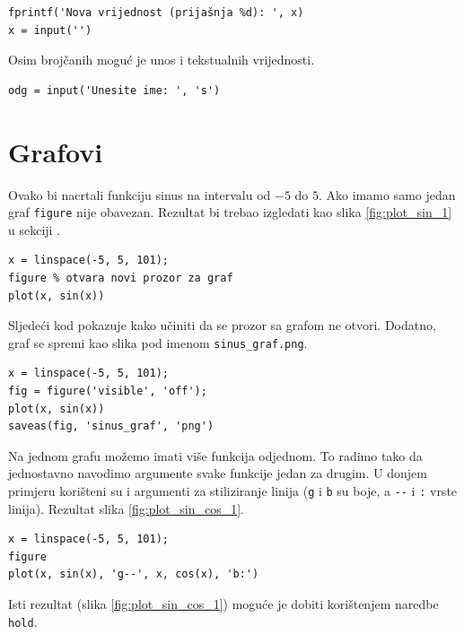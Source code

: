 \documentclass[a4paper, 10pt]{article}
\begin{document}
\begin{lstlisting}
fprintf('Nova vrijednost (prijašnja %d): ', x)
x = input('')
\end{lstlisting}

Osim brojčanih moguć je unos i tekstualnih vrijednosti.

\begin{lstlisting}
odg = input('Unesite ime: ', 's')
\end{lstlisting}


\section{Grafovi}

Ovako bi nacrtali funkciju sinus na intervalu od $-5$ do $5$.
Ako imamo samo jedan graf \texttt{figure} nije obavezan.
Rezultat bi trebao izgledati kao slika \ref{fig:plot_sin_1} u sekciji .

\begin{lstlisting}
x = linspace(-5, 5, 101);
figure % otvara novi prozor za graf
plot(x, sin(x))
\end{lstlisting}

Sljedeći kod pokazuje kako učiniti da se prozor sa grafom ne otvori.
Dodatno, graf se spremi kao slika pod imenom \texttt{sinus\_graf.png}.

\begin{lstlisting}
x = linspace(-5, 5, 101);
fig = figure('visible', 'off');
plot(x, sin(x))
saveas(fig, 'sinus_graf', 'png')
\end{lstlisting}

Na jednom grafu možemo imati više funkcija odjednom.
To radimo tako da jednostavno navodimo argumente svake funkcije jedan za drugim.
U donjem primjeru korišteni su i argumenti za stiliziranje linija (\texttt{g} i \texttt{b} su boje, a \texttt{-{}-} i \texttt{:} vrste linija).
Rezultat slika \ref{fig:plot_sin_cos_1}.

\begin{lstlisting}
x = linspace(-5, 5, 101);
figure
plot(x, sin(x), 'g--', x, cos(x), 'b:')
\end{lstlisting}

Isti rezultat (slika \ref{fig:plot_sin_cos_1}) moguće je dobiti korištenjem naredbe \texttt{hold}.
\end{document}
